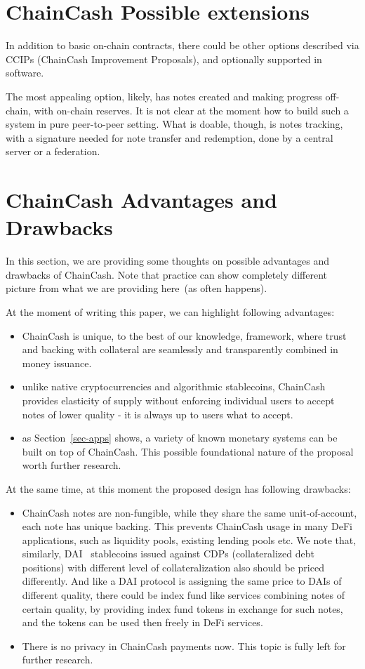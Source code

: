 \documentclass{ifcolog}
\newcommand{\cc}{ChainCash}
\begin{document}
\section{\cc{} Possible extensions}

In addition to basic on-chain contracts, there could be other options described via CCIPs
(ChainCash Improvement Proposals), and optionally supported in software.

The most appealing option, likely, has notes created and making progress off-chain, with on-chain reserves.
It is not clear at the moment how to build such a system in pure peer-to-peer setting. What is doable, though, is
notes tracking, with a signature needed for note transfer and redemption, done by a central server or a federation.

\section{\cc{} Advantages and Drawbacks}
\label{sec-adv}

In this section, we are providing some thoughts on possible advantages and drawbacks of \cc{}. Note that practice can show
completely different picture from what we are providing here~(as often happens).


At the moment of writing this paper, we can highlight following advantages:
\begin{itemize}
  \item ChainCash is unique, to the best of our knowledge, framework, where trust and backing with collateral are
   seamlessly and transparently combined in money issuance.
  \item unlike native cryptocurrencies and algorithmic stablecoins, \cc{} provides elasticity of supply without enforcing
  individual users to accept notes of lower quality - it is always up to users what to accept.
  \item as Section~\ref{sec-apps} shows, a variety of known monetary systems can be built on top of \cc{}. This possible
  foundational nature of the proposal worth further research.
\end{itemize}

At the same time, at this moment the proposed design has following drawbacks:
\begin{itemize}
  \item ChainCash notes are non-fungible, while they share the same unit-of-account, each note has unique backing. This prevents ChainCash usage
  in many DeFi applications, such as liquidity pools, existing lending pools etc. We note that, similarly, DAI~\cite{woltzenlogel2023stablecoin} stablecoins issued against CDPs
  (collateralized debt positions) with different level of collateralization also should be priced differently. And like a DAI protocol is assigning the same price to
  DAIs of different quality, there could be index fund like services combining notes of certain quality, by providing index fund tokens
  in exchange for such notes, and the tokens can be used then freely in DeFi services.
  \item There is no privacy in \cc{} payments now. This topic is fully left for further research.
\end{itemize}




\end{document}
